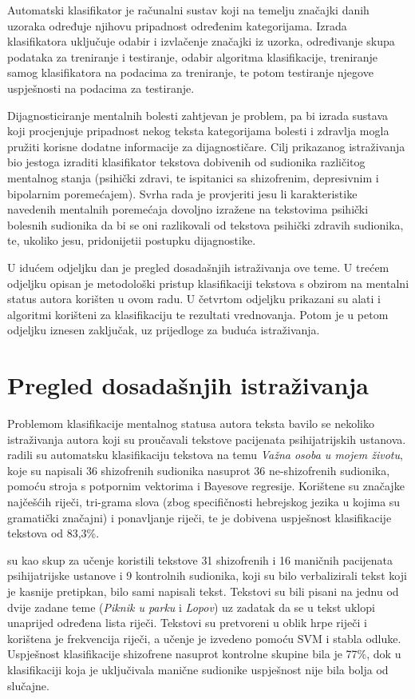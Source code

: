 \documentclass[10pt, a4paper]{article}
\begin{document}
Automatski klasifikator je računalni sustav koji na temelju značajki danih uzoraka određuje njihovu pripadnost određenim kategorijama. Izrada klasifikatora uključuje odabir i izvlačenje značajki iz uzorka, određivanje skupa podataka za treniranje i testiranje, odabir algoritma klasifikacije, treniranje samog klasifikatora na podacima za treniranje, te potom testiranje njegove uspješnosti na podacima za testiranje. 

Dijagnosticiranje mentalnih bolesti zahtjevan je problem, pa bi izrada sustava koji procjenjuje pripadnost nekog teksta kategorijama bolesti i zdravlja mogla pružiti korisne dodatne informacije za dijagnostičare. Cilj prikazanog istraživanja bio jestoga izraditi klasifikator tekstova dobivenih od sudionika različitog mentalnog stanja (psihički zdravi, te ispitanici sa shizofrenim, depresivnim i bipolarnim poremećajem). Svrha rada je provjeriti jesu li karakteristike navedenih mentalnih poremećaja dovoljno izražene na tekstovima psihički bolesnih sudionika da bi se oni razlikovali od tekstova psihički zdravih sudionika, te, ukoliko jesu, pridonijetii postupku dijagnostike.

U idućem odjeljku dan je pregled dosadašnjih istraživanja ove teme. U trećem odjeljku opisan je metodološki pristup klasifikaciji tekstova s obzirom na mentalni status autora korišten u ovom radu. U četvrtom odjeljku prikazani su alati i algoritmi korišteni za klasifikaciju te rezultati vrednovanja. Potom je u petom odjeljku iznesen zaključak, uz prijedloge za buduća istraživanja.

\section{Pregled dosadašnjih istraživanja}
Problemom klasifikacije mentalnog statusa autora teksta bavilo se nekoliko istraživanja autora koji su proučavali tekstove pacijenata psihijatrijskih ustanova. \citet{strous-2009} radili su automatsku klasifikaciju tekstova na temu \emph{Važna osoba u mojem životu}, koje su napisali 36 shizofrenih sudionika nasuprot 36 ne-shizofrenih sudionika, pomoću stroja s potpornim vektorima  i Bayesove regresije. Korištene su značajke najčešćih riječi, tri-grama slova (zbog specifičnosti hebrejskog jezika u kojima su gramatički značajni) i ponavljanje riječi, te je dobivena uspješnost klasifikacije tekstova od 83,3\%.

\citet{exray} su kao skup za učenje koristili tekstove 31 shizofrenih i 16 maničnih pacijenata psihijatrijske ustanove i 9 kontrolnih sudionika, koji su bilo verbalizirali tekst koji je kasnije pretipkan, bilo sami napisali tekst. Tekstovi su bili pisani na jednu od dvije zadane teme (\emph{Piknik u parku} i \emph{Lopov}) uz zadatak da se u tekst uklopi unaprijed određena lista riječi. Tekstovi su pretvoreni u oblik hrpe riječi  i korištena je frekvencija riječi, a učenje je izvedeno pomoću SVM i stabla odluke. Uspješnost klasifikacije shizofrene nasuprot kontrolne skupine bila je 77\%, dok u klasifikaciji koja je uključivala manične sudionike uspješnost nije bila bolja od slučajne. 
\end{document}

